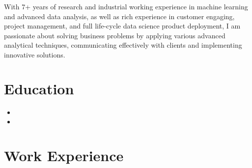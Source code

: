 \documentclass[11pt,a4paper,sans]{moderncv}        %
\begin{document}
\makecvtitle
\vspace*{-8mm}
\small{With 7+ years of research and industrial working experience in machine learning and advanced data analysis, as well as rich experience in customer engaging, project management, and full life-cycle data science product deployment, I am passionate about solving business problems by applying various advanced analytical techniques, communicating effectively with clients and implementing innovative solutions. }



\section{Education}

\vspace{4pt}
%
%

\begin{itemize}
	
	\item{}
	
	\item{}  %
	
\end{itemize}


\section{Work Experience}
\end{document}
